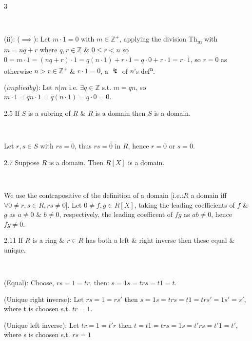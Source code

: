 \documentclass[8pt]{extarticle}
\makeatletter
\renewenvironment{proof}[1][\proofname]{%
  \begin{tcolorbox}[proofpairboxstyle]%
  \pushQED{\qed}%
  \normalfont\itshape #1\@addpunct{.}\ \normalfont\ignorespaces
}{%
  \popQED%
  \end{tcolorbox}%
}
\makeatother
\begin{document}
\begin{multicols*}{3}
\begin{proof}
            (ii): (\(\implies\)): Let \(m\cdot 1=0\) with \(m\in\mathbb{Z}^+\), applying the division Th\textsubscript{m} with \(m=nq+r\) where \(q,r\in\mathbb{Z}\) \& \(0\le r<n\) so \(0=m\cdot1=(nq+r)\cdot1=q(n\cdot1)+r\cdot1=q\cdot0+r\cdot1=r\cdot1\), so \(r=0\) as otherwise \(n>r\in\mathbb{Z}^+\) \& \(r\cdot 1=0\), a \(\lightning\) of \(n\)'s def\textsuperscript{n}.

            (\(impliedby\)): Let \(n|m\) i.e. \(\exists q\in\mathbb{Z}\) s.t. \(m=qn\), so \(m\cdot1=qn\cdot1=q(n\cdot1)=q\cdot0=0\).
        \end{proof}


        \begin{lemma}{2.5}
            If \(S\) is a subring of \(R\) \& \(R\) is a domain then \(S\) is a domain.
        \end{lemma}

        \begin{proof}
            Let \(r,s\in S\) with \(rs=0\), thus \(rs=0\) in \(R\), hence \(r=0\) or \(s=0\).
        \end{proof}

        \begin{proposition}{2.7}
            Suppose \(R\) is a domain. Then \(R[X]\) is a domain.
        \end{proposition}

        \begin{proof}
            We use the contrapositive of the definition of a domain [i.e.:\(R\) a domain iff \(\forall 0\ne r,s\in R, rs\ne 0\)]. Let \(0\ne f,g\in R[X]\), taking the leading coefficients of \(f\) \& \(g\) as \(a\ne0\) \& \(b\ne0\), respectively, the leading coefficent of \(fg\) as \(ab\ne0\), hence \(fg\ne0\).
        \end{proof}

        \begin{lemma}{2.11}
            If \(R\) is a ring \& \(r\in R\) has both a left \& right inverse then these equal \& unique.
        \end{lemma}

        \begin{proof}
            (Equal): Choose, \(rs=1=tr\), then: \(s=1s=trs=t1=t\).

            (Unique right inverse): Let \(rs=1=rs'\) then \(s=1s=trs=t1=trs'=1s'=s'\), where t is choosen s.t. \(tr=1\).

            (Unique left inverse): Let \(tr=1=t'r\) then \(t=t1=trs=1s=t'rs=t'1=t'\), where s is choosen s.t. \(rs=1\)
        \end{proof}


\end{multicols*}
\end{document}
